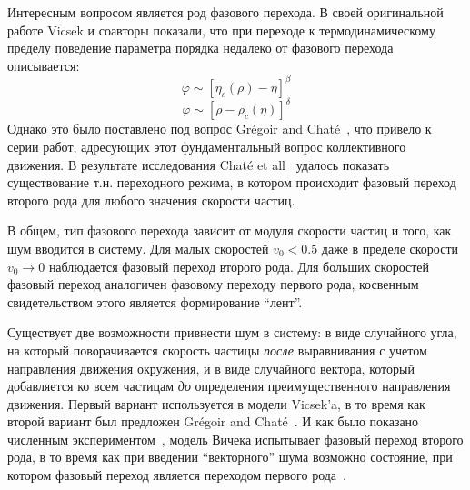     Интересным вопросом является род фазового перехода. В своей оригинальной работе Vicsek и соавторы показали, что при переходе к термодинамическому пределу поведение параметра порядка недалеко от фазового перехода описывается:
    \begin{equation}
        \varphi \sim [\eta_c(\rho)-\eta]^\beta
    \end{equation}
    \begin{equation}
        \varphi \sim [\rho-\rho_c(\eta)]^\delta
    \end{equation}
    Однако это было поставлено под вопрос Gr\'egoir and Chat\'e~\cite{gregoire2004}, что привело к серии работ, адресующих этот фундаментальный вопрос коллективного движения. В результате исследования Chat\'e et all~\cite{chate2008} удалось показать существование т.н. переходного режима, в котором происходит фазовый переход второго рода для любого значения скорости частиц.

    В общем, тип фазового перехода зависит от модуля скорости частиц и того, как шум вводится в систему. Для малых скоростей $v_0 < 0.5$ даже в пределе скорости $v_0 \to 0$ наблюдается фазовый переход второго рода. Для больших скоростей фазовый переход аналогичен фазовому переходу первого рода, косвенным свидетельством этого является формирование ``лент''.~\cite{huepe2008}

    Существует две возможности привнести шум в систему: в виде случайного угла, на который поворачивается скорость частицы \textit{после} выравнивания с учетом направления движения окружения, и в виде случайного вектора, который добавляется ко всем частицам \textit{до} определения преимущественного направления движения. Первый вариант используется в модели Vicsek'a, в то время как второй вариант был предложен Gr\'egoir and Chat\'e~\cite{gregoire2004}. И как было показано численным экспериментом~\cite{baglietto2008}, модель Вичека испытывает фазовый переход второго рода, в то время как при введении ``векторного'' шума возможно состояние, при котором фазовый переход является переходом первого рода~\cite{aldana2009}.
